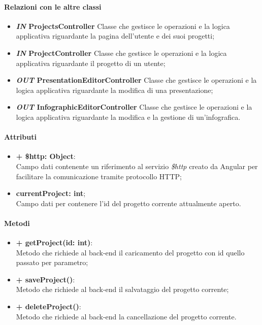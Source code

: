 	\paragraph{Relazioni con le altre classi}
	\begin{itemize}
		\item \textbf{\textit{IN} ProjectsController}
		Classe che gestisce le operazioni e la logica applicativa riguardante la pagina dell'utente e dei suoi progetti;
		\item \textbf{\textit{IN} ProjectController}
		Classe che gestisce le operazioni e la logica applicativa riguardante il progetto di un utente;
		\item \textbf{\textit{OUT} PresentationEditorController}
		Classe che gestisce le operazioni e la logica applicativa riguardante la modifica di una presentazione;
		\item \textbf{\textit{OUT} InfographicEditorController}
		Classe che gestisce le operazioni e la logica applicativa riguardante la modifica e la gestione di un'infografica.
	\end{itemize}
	
	\paragraph{Attributi}
	\begin{itemize}
		\item \textbf{+ \$http: Object}:\\
		Campo dati contenente un riferimento al servizio \textit{\$http} creato da Angular per facilitare la comunicazione tramite protocollo HTTP;
		\item \textbf{currentProject: int};\\
		Campo dati per contenere l'id del progetto corrente attualmente aperto.
	\end{itemize}
	
	\paragraph{Metodi}
	\begin{itemize}
		\item \textbf{+ getProject(id: int)}:\\
		Metodo che richiede al back-end il caricamento del progetto con id quello passato per parametro;
		\item \textbf{+ saveProject()}:\\
		Metodo che richiede al back-end il salvataggio del progetto corrente;
		\item \textbf{+ deleteProject()}:\\
		Metodo che richiede al back-end la cancellazione del progetto corrente.
	\end{itemize}
	

